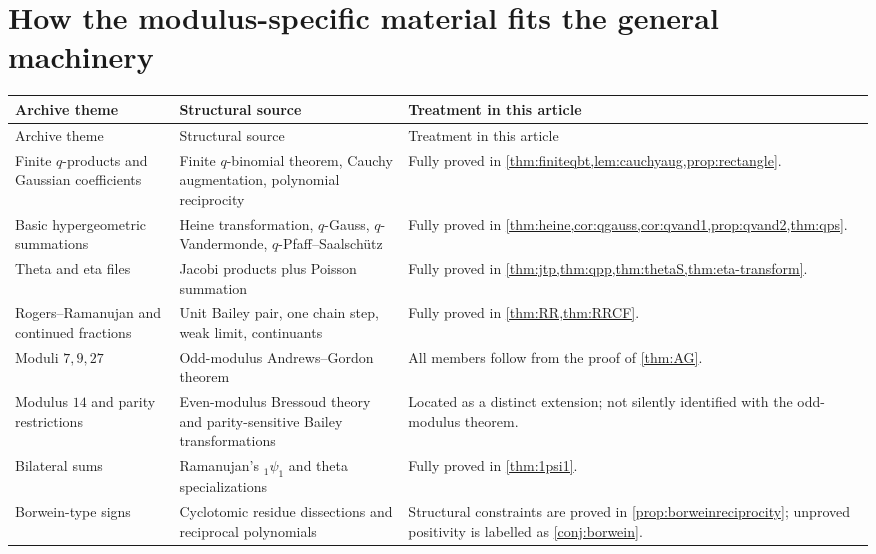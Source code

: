 \documentclass[11pt]{article}
\numberwithin{equation}{section}
\theoremstyle{definition}
\theoremstyle{remark}
\begin{document}
\section{How the modulus-specific material fits the general machinery}
\label{sec:extensions}

\begin{longtable}{>{\raggedright\arraybackslash}p{}
                  >{\raggedright\arraybackslash}p{}
                  >{\raggedright\arraybackslash}p{}}
\toprule
Archive theme & Structural source & Treatment in this article\\
\midrule
\endfirsthead
\toprule
Archive theme & Structural source & Treatment in this article\\
\midrule
\endhead
Finite $q$-products and Gaussian coefficients & Finite $q$-binomial theorem,
Cauchy augmentation, polynomial reciprocity & Fully proved in
\cref{thm:finiteqbt,lem:cauchyaug,prop:rectangle}.\\
\addlinespace
Basic hypergeometric summations & Heine transformation, $q$-Gauss,
$q$-Vandermonde, $q$-Pfaff--Saalsch\"utz & Fully proved in
\cref{thm:heine,cor:qgauss,cor:qvand1,prop:qvand2,thm:qps}.\\
\addlinespace
Theta and eta files & Jacobi products plus Poisson summation & Fully proved in
\cref{thm:jtp,thm:qpp,thm:thetaS,thm:eta-transform}.\\
\addlinespace
Rogers--Ramanujan and continued fractions & Unit Bailey pair, one chain step,
weak limit, continuants & Fully proved in
\cref{thm:RR,thm:RRCF}.\\
\addlinespace
Moduli $7,9,27$ & Odd-modulus Andrews--Gordon theorem & All members follow
from the proof of \cref{thm:AG}.\\
\addlinespace
Modulus $14$ and parity restrictions & Even-modulus Bressoud theory and
parity-sensitive Bailey transformations & Located as a distinct extension;
not silently identified with the odd-modulus theorem.\\
\addlinespace
Bilateral sums & Ramanujan's ${}_1\psi_1$ and theta specializations & Fully
proved in \cref{thm:1psi1}.\\
\addlinespace
Borwein-type signs & Cyclotomic residue dissections and reciprocal
polynomials & Structural constraints are proved in
\cref{prop:borweinreciprocity}; unproved positivity is labelled as
\cref{conj:borwein}.\\
\bottomrule
\end{longtable}
\end{document}
